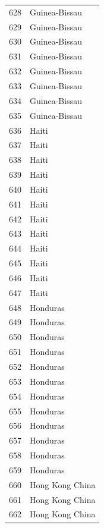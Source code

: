 \documentclass[
  letterpaper,
  DIV=11,
  numbers=noendperiod]{scrreprt}
\begin{document}
\begin{tabular}{ll}
628  &             Guinea-Bissau \\
629  &             Guinea-Bissau \\
630  &             Guinea-Bissau \\
631  &             Guinea-Bissau \\
632  &             Guinea-Bissau \\
633  &             Guinea-Bissau \\
634  &             Guinea-Bissau \\
635  &             Guinea-Bissau \\
636  &                     Haiti \\
637  &                     Haiti \\
638  &                     Haiti \\
639  &                     Haiti \\
640  &                     Haiti \\
641  &                     Haiti \\
642  &                     Haiti \\
643  &                     Haiti \\
644  &                     Haiti \\
645  &                     Haiti \\
646  &                     Haiti \\
647  &                     Haiti \\
648  &                  Honduras \\
649  &                  Honduras \\
650  &                  Honduras \\
651  &                  Honduras \\
652  &                  Honduras \\
653  &                  Honduras \\
654  &                  Honduras \\
655  &                  Honduras \\
656  &                  Honduras \\
657  &                  Honduras \\
658  &                  Honduras \\
659  &                  Honduras \\
660  &           Hong Kong China \\
661  &           Hong Kong China \\
662  &           Hong Kong China \\

\end{tabular}
\end{document}
